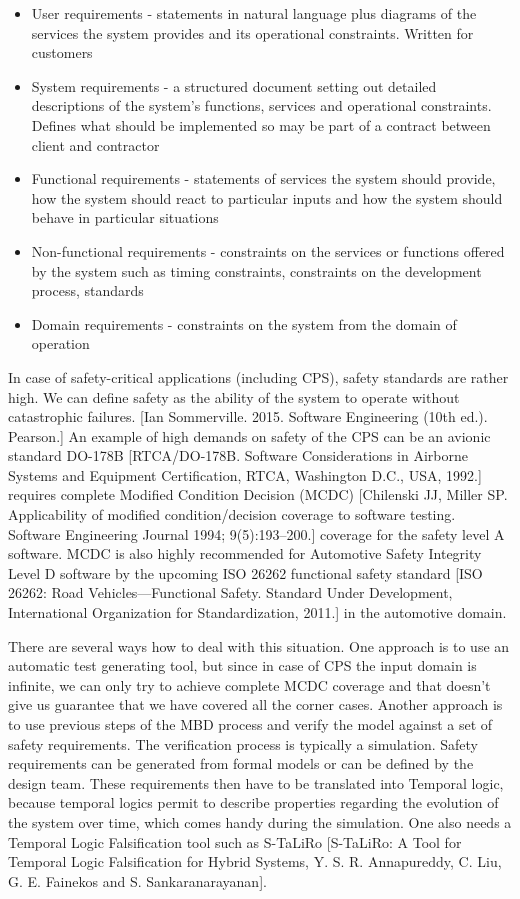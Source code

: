 \begin{itemize}
	\item User requirements - statements in natural language plus diagrams of the services the system provides and its operational constraints. Written for customers
	\item System requirements - a structured document setting out detailed descriptions of the system’s functions, services and operational constraints. Defines what should be implemented so may be part of a contract between client and contractor
	\item Functional requirements - statements of services the system should provide, how the system should react to particular inputs and how the system should behave in particular situations
	\item Non-functional requirements - constraints on the services or functions offered by the system such as timing constraints, constraints on the development process, standards
	\item Domain requirements - constraints on the system from the domain of operation
\end{itemize}

In case of safety-critical applications (including CPS), safety standards are rather high. We can define safety as the ability of the system to operate without catastrophic failures. [Ian Sommerville. 2015. Software Engineering (10th ed.). Pearson.] An example of high demands on safety of the CPS can be an avionic standard DO-178B [RTCA/DO-178B. Software Considerations in Airborne Systems and Equipment Certification, RTCA, Washington D.C., USA, 1992.] requires complete Modified Condition Decision (MCDC) [Chilenski JJ, Miller SP. Applicability of modified condition/decision coverage to software testing. Software Engineering Journal 1994; 9(5):193–200.] coverage for the safety level A software. MCDC is also highly recommended for Automotive Safety Integrity Level D software by the upcoming ISO 26262 functional safety standard [ISO 26262: Road Vehicles—Functional Safety. Standard Under Development, International Organization for Standardization, 2011.] in the automotive domain.

There are several ways how to deal with this situation. One approach is to use an automatic test generating tool, but since in case of CPS the input domain is infinite, we can only try to achieve complete MCDC coverage and that doesn't give us guarantee that we have covered all the corner cases. Another approach is to use previous steps of the MBD process and verify the model against a set of safety requirements. The verification process is typically a simulation. Safety requirements can be generated from formal models or can be defined by the design team. These requirements then have to be translated into Temporal logic, because temporal logics permit to describe properties regarding the evolution of the system over time, which comes handy during the simulation. One also needs a Temporal Logic Falsification tool such as S-TaLiRo [S-TaLiRo: A Tool for Temporal Logic Falsification for Hybrid Systems, Y. S. R. Annapureddy, C. Liu, G. E. Fainekos and S. Sankaranarayanan].

